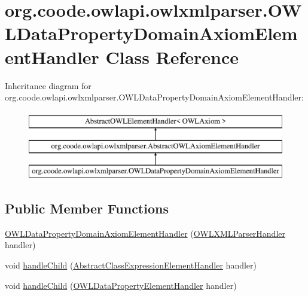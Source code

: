 \hypertarget{classorg_1_1coode_1_1owlapi_1_1owlxmlparser_1_1_o_w_l_data_property_domain_axiom_element_handler}{\section{org.\-coode.\-owlapi.\-owlxmlparser.\-O\-W\-L\-Data\-Property\-Domain\-Axiom\-Element\-Handler Class Reference}
\label{classorg_1_1coode_1_1owlapi_1_1owlxmlparser_1_1_o_w_l_data_property_domain_axiom_element_handler}
}
Inheritance diagram for org.\-coode.\-owlapi.\-owlxmlparser.\-O\-W\-L\-Data\-Property\-Domain\-Axiom\-Element\-Handler\-:\begin{figure}[H]
\begin{center}
\leavevmode
\includegraphics[height=3.000000cm]{classorg_1_1coode_1_1owlapi_1_1owlxmlparser_1_1_o_w_l_data_property_domain_axiom_element_handler}
\end{center}
\end{figure}
\subsection*{Public Member Functions}
\begin{DoxyCompactItemize}
\item 
\hyperlink{classorg_1_1coode_1_1owlapi_1_1owlxmlparser_1_1_o_w_l_data_property_domain_axiom_element_handler_ad0c46c86f74f0cfd988c44171e88936c}{O\-W\-L\-Data\-Property\-Domain\-Axiom\-Element\-Handler} (\hyperlink{classorg_1_1coode_1_1owlapi_1_1owlxmlparser_1_1_o_w_l_x_m_l_parser_handler}{O\-W\-L\-X\-M\-L\-Parser\-Handler} handler)
\item 
void \hyperlink{classorg_1_1coode_1_1owlapi_1_1owlxmlparser_1_1_o_w_l_data_property_domain_axiom_element_handler_a4688201f1eb37a04b52ea947571b1446}{handle\-Child} (\hyperlink{classorg_1_1coode_1_1owlapi_1_1owlxmlparser_1_1_abstract_class_expression_element_handler}{Abstract\-Class\-Expression\-Element\-Handler} handler)
\item 
void \hyperlink{classorg_1_1coode_1_1owlapi_1_1owlxmlparser_1_1_o_w_l_data_property_domain_axiom_element_handler_aa280c2a2a03d6ed5e20416b6140cdea1}{handle\-Child} (\hyperlink{classorg_1_1coode_1_1owlapi_1_1owlxmlparser_1_1_o_w_l_data_property_element_handler}{O\-W\-L\-Data\-Property\-Element\-Handler} handler)
\end{DoxyCompactItemize}
